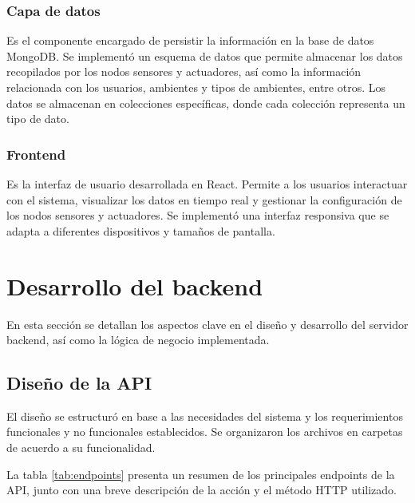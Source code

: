 \subsubsection{Capa de datos}

Es el componente encargado de persistir la información en la base de datos
MongoDB. Se implementó un esquema de datos que permite almacenar los datos
recopilados por los nodos sensores y actuadores, así como la información
relacionada con los usuarios, ambientes y tipos de ambientes, entre otros. Los
datos se almacenan en colecciones específicas, donde cada colección representa
un tipo de dato.

\subsubsection{Frontend}

Es la interfaz de usuario desarrollada en React. Permite a los usuarios
interactuar con el sistema, visualizar los datos en tiempo real y gestionar la
configuración de los nodos sensores y actuadores. Se implementó una interfaz
responsiva que se adapta a diferentes dispositivos y tamaños de pantalla.

\section{Desarrollo del backend}

En esta sección se detallan los aspectos clave en el diseño y desarrollo del
servidor backend, así como la lógica de negocio implementada.

\subsection{Diseño de la API}

El diseño se estructuró en base a las necesidades del sistema y los
requerimientos funcionales y no funcionales establecidos. Se organizaron los
archivos en carpetas de acuerdo a su funcionalidad. %

La tabla \ref{tab:endpoints} presenta un resumen de los principales endpoints
de la API, junto con una breve descripción de la acción y el método HTTP
utilizado.

